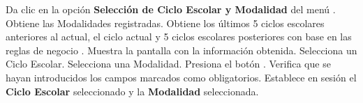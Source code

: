 \begin{UCtrayectoria} %
    \UCpaso[\UCactor] Da clic en la opción \textbf{Selección de Ciclo Escolar y Modalidad} del menú . %
    \UCpaso Obtiene las Modalidades registradas. %
    \UCpaso Obtiene los últimos 5 ciclos escolares anteriores al actual, el ciclo actual y 5 ciclos escolares posteriores con base en las reglas de negocio . %
    \UCpaso Muestra la pantalla  con la información obtenida. %
    \UCpaso [\UCactor] \label{IN-DAE-CU1:selecciona} Selecciona un Ciclo Escolar.
    \UCpaso [\UCactor] Selecciona una Modalidad. %
    \UCpaso [\UCactor] \label{DAE-IN-CU1:acp} Presiona el botón . 
    \UCpaso Verifica que se hayan introducidos los campos marcados como obligatorios. 
    \UCpaso Establece en sesión el {\bf Ciclo Escolar} seleccionado y la {\bf Modalidad} seleccionada.
    
\end{UCtrayectoria}
